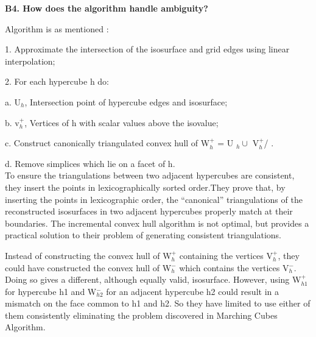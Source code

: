 \documentclass{article}[12pt]
\begin{document}
\vspace{2ex}\noindent
{ \bf B4. How does the algorithm handle ambiguity? }
{
   
   Algorithm is as mentioned : 

    1.   Approximate  the intersection of the isosurface and grid edges using linear interpolation;

    2.   For each hypercube h do:

    a.   U$_{h}$,  Intersection  point of hypercube edges and isosurface;

    b.   v$^{+}_{h}$,  Vertices of h with scalar values above the isovalue;

    c.   Construct canonically  triangulated convex  hull of  W$^{+}_{h}$ = U $_{h} \cup$  V$^{+}_{h}$/ .

    d.   Remove simplices  which lie on a facet of h. \\
    
   To ensure the triangulations between two adjacent hypercubes are consistent, they insert the points in lexicographically sorted order.They prove that, by inserting the points in lexicographic order, the “canonical” triangulations of the reconstructed isosurfaces in two adjacent hypercubes properly match at their boundaries. The incremental convex hull algorithm is not optimal, but provides a practical solution to their problem of generating consistent triangulations.
   
   Instead of constructing the convex hull of W$^{+}_{h}$ containing the vertices V$^{+}_{h}$, they could have constructed the convex hull of W$^{-}_{h}$ which contains the vertices V$^{-}_{h}$. Doing so gives a different, although equally valid, isosurface. However, using W$^{+}_{h1}$  for hypercube h1 and W$^{-}_{h2}$ for an adjacent hypercube h2 could result in a mismatch on the face common to h1 and h2. So they have limited to use either of them consistently eliminating the problem discovered in Marching Cubes Algorithm.
    
}
\end{document}
